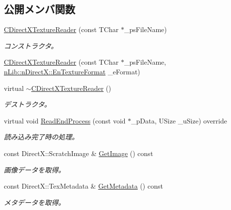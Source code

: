 \subsection*{公開メンバ関数}
\begin{DoxyCompactItemize}
\item 
\hyperlink{class_c_direct_x_texture_reader_a8067f8058a6d70ea0a9ff46aee2ae643}{C\+Direct\+X\+Texture\+Reader} (const T\+Char $\ast$\+\_\+ps\+File\+Name)
\begin{DoxyCompactList}\small\item\em コンストラクタ。 \end{DoxyCompactList}\item 
\hyperlink{class_c_direct_x_texture_reader_af93e4ced10f50fd4070f826f33730f9a}{C\+Direct\+X\+Texture\+Reader} (const T\+Char $\ast$\+\_\+ps\+File\+Name, \hyperlink{namespacen_lib_1_1n_direct_x_a47fcba27656dfc022d6e7ca2a505da65}{n\+Lib\+::n\+Direct\+X\+::\+En\+Texture\+Format} \+\_\+e\+Format)
\item 
virtual \hyperlink{class_c_direct_x_texture_reader_a19885f989b8efc0ae652a27ddfe655e5}{$\sim$\+C\+Direct\+X\+Texture\+Reader} ()
\begin{DoxyCompactList}\small\item\em デストラクタ。 \end{DoxyCompactList}\item 
virtual void \hyperlink{class_c_direct_x_texture_reader_abae2b7a2cf1957d8f0d117851bab35d5}{Read\+End\+Process} (const void $\ast$\+\_\+p\+Data, U\+Size \+\_\+u\+Size) override
\begin{DoxyCompactList}\small\item\em 読み込み完了時の処理。 \end{DoxyCompactList}\item 
const Direct\+X\+::\+Scratch\+Image \& \hyperlink{class_c_direct_x_texture_reader_af12294b81ba5ca060ac58d0b53dfb6e6}{Get\+Image} () const 
\begin{DoxyCompactList}\small\item\em 画像データを取得。 \end{DoxyCompactList}\item 
const Direct\+X\+::\+Tex\+Metadata \& \hyperlink{class_c_direct_x_texture_reader_aaa6dc8a5b66797b9661fc2f13ef642cb}{Get\+Metadata} () const 
\begin{DoxyCompactList}\small\item\em メタデータを取得。 \end{DoxyCompactList}\end{DoxyCompactItemize}
